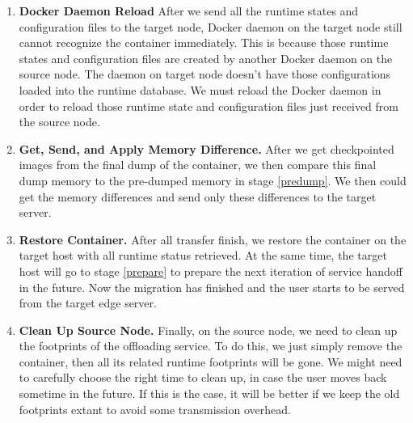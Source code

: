 \begin{enumerate}[label=\textbf{S\arabic*}]
\item \label{daemon-Reload} \textbf{Docker Daemon Reload} After we send all the runtime states and configuration files to the target node, Docker daemon on the target node still cannot recognize the container immediately.  This is because those runtime states and configuration files are created by another Docker daemon on the source node. The daemon on target node doesn't have those configurations loaded into the runtime database. We  must reload the Docker daemon in order to reload those runtime state and configuration files just received from the source node.

\item \label{img-sync} \textbf{Get, Send, and Apply Memory Difference.} After we get checkpointed images from the final dump of the container, we then compare this final dump memory to the pre-dumped memory in stage \ref{predump}. We then could get the memory differences and send only these differences to the target server. 

\item \label{restore} \textbf{Restore Container.} After all transfer finish, we restore the container on the target host with all runtime status retrieved. At the same time, the target host will go to stage \ref{prepare} to prepare the next iteration of service handoff in the future. Now the migration has finished and the user starts to be served from the target edge server.

\item \label{clean} \textbf{Clean Up Source Node.} Finally, on the source node, we need to clean up the footprints of the offloading service. To do this, we just simply remove the container, then all its related runtime footprints will be gone. We might need to carefully choose the right time to clean up, in case the user moves back sometime in the future. If this is the case, it will be better if we keep the old footprints extant to avoid some transmission overhead. 


\end{enumerate}



% 
% 

